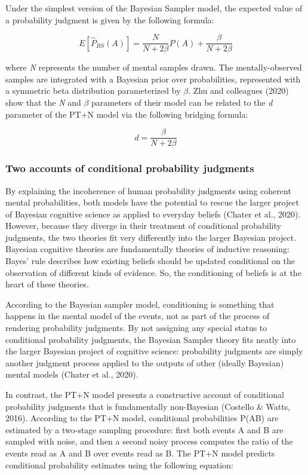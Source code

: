 \documentclass[
  english,
  man,floatsintext]{apa6}
\begin{document}
Under the simplest version of the Bayesian Sampler model, the expected value of a probability judgment is given by the following formula:

\[E[\hat{P}_{BS}(A)] = \frac{N}{N+2\beta}P(A) + \frac{\beta}{N+2\beta}\]

where \emph{N} represents the number of mental samples drawn. The mentally-observed samples are integrated with a Bayesian prior over probabilities, represented with a symmetric beta distribution parameterized by \(\beta\). Zhu and colleagues (2020) show that the \emph{N} and \(\beta\) parameters of their model can be related to the \emph{d} parameter of the PT+N model via the following bridging formula:

\[d = \frac{\beta}{N+2\beta}\]

\hypertarget{two-accounts-of-conditional-probability-judgments}{%
\subsubsection{Two accounts of conditional probability judgments}\label{two-accounts-of-conditional-probability-judgments}}

By explaining the incoherence of human probability judgments using coherent mental probabilities, both models have the potential to rescue the larger project of Bayesian cognitive science as applied to everyday beliefs (Chater et al., 2020). However, because they diverge in their treatment of conditional probability judgments, the two theories fit very differently into the larger Bayesian project. Bayesian cognitive theories are fundamentally theories of inductive reasoning: Bayes' rule describes how existing beliefs should be updated conditional on the observation of different kinds of evidence. So, the conditioning of beliefs is at the heart of these theories.

According to the Bayesian sampler model, conditioning is something that happens in the mental model of the events, not as part of the process of rendering probability judgments. By not assigning any special status to conditional probability judgments, the Bayesian Sampler theory fits neatly into the larger Bayesian project of cognitive science: probability judgments are simply another judgment process applied to the outputs of other (ideally Bayesian) mental models (Chater et al., 2020).

In contrast, the PT+N model presents a constructive account of conditional probability judgments that is fundamentally non-Bayesian (Costello \& Watts, 2016). According to the PT+N model, conditional probabilities P(A\textbar B) are estimated by a two-stage sampling procedure: first both events A and B are sampled with noise, and then a second noisy process computes the ratio of the events read as A and B over events read as B. The PT+N model predicts conditional probability estimates using the following equation:
\end{document}
